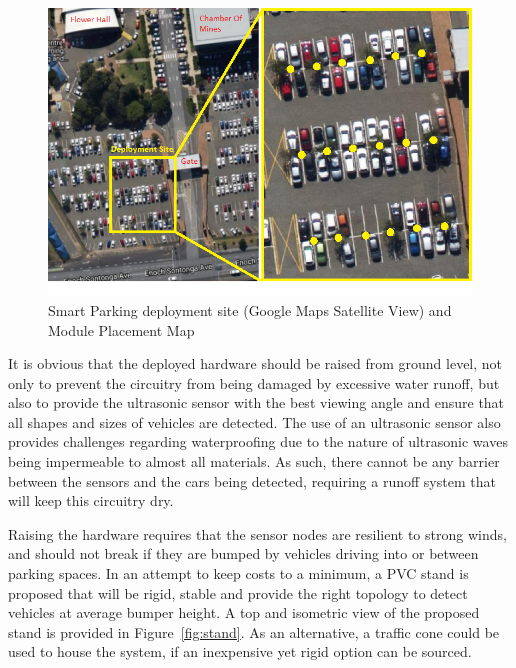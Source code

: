 \documentclass[10pt,twocolumn]{witseiepaper}
\begin{document}
		\begin{figure}
			\centering
			\includegraphics[width=1\columnwidth]{media/deploymentSite.png}
			\caption{Smart Parking deployment site (Google Maps Satellite View) and Module Placement Map}
			\raggedright
			\label{fig:deployment}
		\end{figure}
	
		It is obvious that the deployed hardware should be raised from ground level, not only to prevent the circuitry from being damaged by excessive  water runoff, but also to provide the ultrasonic sensor with the best viewing angle and ensure that all shapes and sizes of vehicles are detected. The use of an ultrasonic sensor also provides challenges regarding waterproofing due to the nature of ultrasonic waves being impermeable to almost all materials. As such, there cannot be any barrier between the sensors and the cars being detected, requiring a runoff system that will keep this circuitry dry. 
		
		Raising the hardware requires that the sensor nodes are resilient to strong winds, and should not break if they are bumped by vehicles driving into or between parking spaces. In an attempt to keep costs to a minimum, a PVC stand is proposed that will be rigid, stable and provide the right topology to detect vehicles at average bumper height. A top and isometric view of the proposed stand is provided in Figure~\ref{fig:stand}. As an alternative, a traffic cone could be used to house the system, if an inexpensive yet rigid option can be sourced.
		
\end{document}
